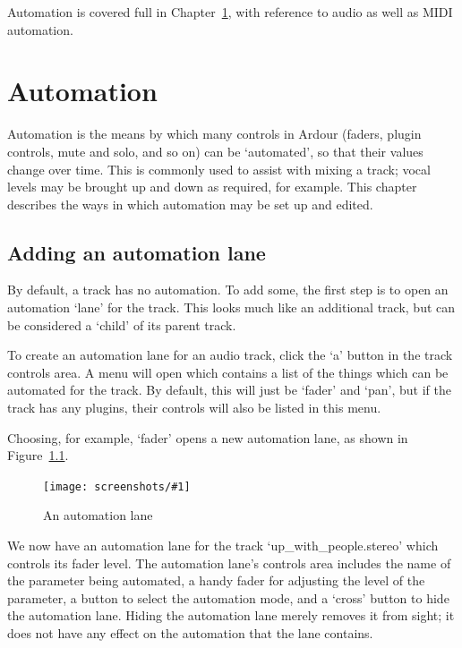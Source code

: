 \documentclass[10pt,a4paper]{book}
\newcommand{\screenshot}[3]{%
\begin{figure}[ht]%
\begin{center}
\texttt{[image: screenshots/\#1]}
\end{center}
\caption{#2}
\label{#3}
\end{figure}}
\begin{document}
{Automation is covered full in Chapter~\ref{ch:automation}, with
reference to audio as well as MIDI automation.




\chapter{Automation}
\label{ch:automation}

Automation is the means by which many controls in Ardour (faders,
plugin controls, mute and solo, and so on) can be `automated', so that
their values change over time.  This is commonly used to assist with
mixing a track; vocal levels may be brought up and down as required,
for example.  This chapter describes the ways in which automation may
be set up and edited.

\section{Adding an automation lane}

By default, a track has no automation.  To add some, the first step is
to open an automation `lane' for the track.  This looks much like an
additional track, but can be considered a `child' of its parent track.

To create an automation lane for an audio track, click the `a' button
in the track controls area.  A menu will open which contains a list of
the things which can be automated for the track.  By default, this
will just be `fader' and `pan', but if the track has any plugins,
their controls will also be listed in this menu.

Choosing, for example, `fader' opens a new automation lane, as shown
in Figure~\ref{fig:automation-lane}.

\screenshot{automation-lane.png}{An automation lane}{fig:automation-lane}

We now have an automation lane for the track `up\_with\_people.stereo'
which controls its fader level.  The automation lane's controls area
includes the name of the parameter being automated, a handy fader for
adjusting the level of the parameter, a button to select the
automation mode, and a `cross' button to hide the automation lane.
Hiding the automation lane merely removes it from sight; it does not
have any effect on the automation that the lane contains.


}
\end{document}
